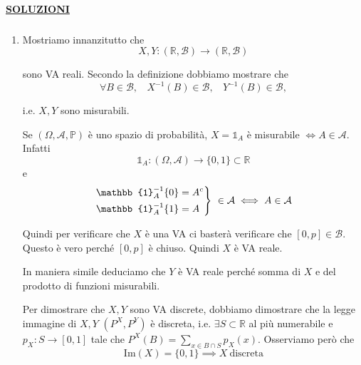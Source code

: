 \textbf{\underline{SOLUZIONI}}






\subsubsection{}
\begin{enumerate}
\item Mostriamo innanzitutto che\begin{equation*}
X,Y:(\mathbb{R} ,\mathcal{B})\rightarrow (\mathbb{R} ,\mathcal{B})
\end{equation*}

sono VA reali. Secondo la definizione dobbiamo mostrare che\begin{equation*}
\forall B\in \mathcal{B} ,\ \ \ \ X^{-1}( B) \in \mathcal{B} ,\ \ \ \ Y^{-1}( B) \in \mathcal{B} ,
\end{equation*}

i.e. $X,Y$ sono misurabili.\begin{oss}
Se $( \Omega ,\mathcal{A} ,\mathbb{P})$ è uno spazio di probabilità, $X=\mathbb{1}_{A}$ è misurabile $\iff A\in \mathcal{A}$. Infatti
\begin{equation*}
\mathbb{1}_{A} :( \Omega ,\mathcal{A})\rightarrow \{0,1\} \subset \mathbb{R}
\end{equation*}
e
\begin{equation*}
\begin{drcases}
\mathbb{1}_{A}^{-1}\{0\} =A^{c}\\
\mathbb{1}_{A}^{-1}\{1\} =A
\end{drcases} \ \in \mathcal{A} \iff A\in \mathcal{A}
\end{equation*}
\end{oss}

Quindi per verificare che $X$ è una VA ci basterà verificare che $[ 0,p] \in \mathcal{B}$. Questo è vero perché $[ 0,p]$ è chiuso. Quindi $X$ è VA reale.

In maniera simile deduciamo che $Y$ è VA reale perché somma di $X$ e del prodotto di funzioni misurabili.

Per dimostrare che $X,Y$ sono VA discrete, dobbiamo dimostrare che la legge immagine di $X,Y$ $\left( P^{X} ,P^{Y}\right)$ è discreta, i.e. $\exists S\subset \mathbb{R}$ al più numerabile e $p_{X} :S\rightarrow [ 0,1]$ tale che $P^{X}( B) =\sum\limits _{x\in B\cap S} p_{X}( x)$. Osserviamo però che\begin{equation*}
\mathrm{Im}( X) =\{0,1\} \implies X\ \text{discreta}
\end{equation*}


\end{enumerate}
